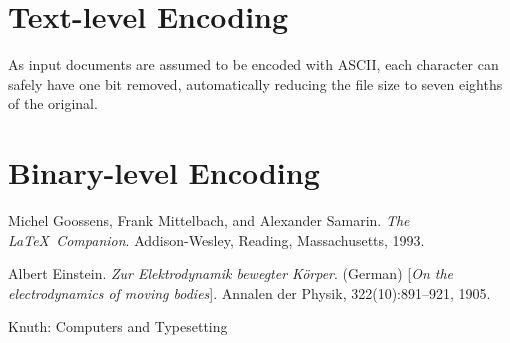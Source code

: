 \documentclass[11pt]{article}
\begin{document}
\begin{multicols*}{2}
        \section{Text-level Encoding}\label{sec:text-level-encoding}
        As input documents are assumed to be encoded with ASCII, each character can safely have one bit removed, automatically reducing the file size to seven eighths of the original.

        \section{Binary-level Encoding}\label{sec:binary-level-encoding}

    \end{multicols*}

    \pagebreak

    \begin{thebibliography}{9}
        Michel Goossens, Frank Mittelbach, and Alexander Samarin.
        \textit{The \LaTeX\ Companion}.
        Addison-Wesley, Reading, Massachusetts, 1993.

        Albert Einstein.
        \textit{Zur Elektrodynamik bewegter K{\"o}rper}. (German)
        [\textit{On the electrodynamics of moving bodies}].
        Annalen der Physik, 322(10):891–921, 1905.

        Knuth: Computers and Typesetting
    \end{thebibliography}
\end{document}
